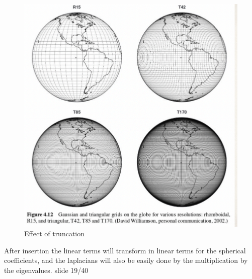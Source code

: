 \begin{figure}[h]
	\centering
	\includegraphics[width=0.5\linewidth]{uploads/Screenshot 2024-11-17 205827.png}
	\caption{Effect of truncation}
	\label{fig:enter-label}
\end{figure}

After insertion the linear terms will transform in linear terms for the spherical coefficients, and the laplacians will also be easily done by the multiplication by the eigenvalues. slide 19/40


